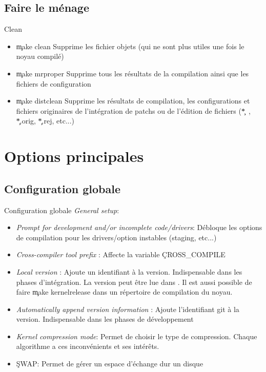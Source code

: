 \subsection{Faire le ménage}

\begin{frame}[fragile=singleslide]{Clean}
  \begin{itemize}
  \item \c{make clean}  Supprime les fichier objets (qui  ne sont plus
    utiles une fois le noyau compilé)
  \item \c{make mrproper} Supprime tous les résultats de la compilation
    ainsi que les fichiers de configuration
  \item \c{make distclean} Supprime  les résultats de compilation, les
    configurations et fichiers  originaires de l'intégration de patchs
    ou  de  l'édition  de  fichiers  (\c{*~},  \c{*.orig},  \c{*.rej},
    etc...)
  \end{itemize} 
\end{frame} 

\section{Options principales}

\subsection{Configuration globale}

\begin{frame}[fragile=singleslide]{Configuration globale}
  \emph{General setup}:
  \begin{itemize} 
  \item \emph{Prompt for  development and/or incomplete code/drivers}:
    Débloque  les  options  de  compilation  pour  les  drivers/option
    instables (staging, etc...)
  \item  \emph{Cross-compiler  tool  prefix}  :  Affecte  la  variable
    \c{CROSS_COMPILE}
  \item   \emph{Local  version}   :   Ajoute  un   identifiant  à   la
    version. Indispensable  dans les phases  d'intégration. La version
    peut être lue dans  . Il est aussi possible de
    faire \c{make kernelrelease} dans  un répertoire de compilation du
    noyau.
  \item  \emph{Automatically  append  version  information}  :  Ajoute
    l'identifiant git  à la version. Indispensable dans  les phases de
    développement
  \item \emph{Kernel  compression mode}: Permet de choisir  le type de
    compression.   Chaque  algorithme   a  ces  inconvénients  et  ses
    intérêts.
  \item \c{SWAP}: Permet de gérer un espace d'échange dur un disque
  \end{itemize}
\end{frame}

